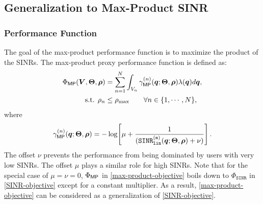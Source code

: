 \subsection{Generalization to Max-Product SINR}\label{MP-Subsection}

\subsubsection{Performance Function}\label{MP-Objective}
The goal of the max-product performance function is to maximize the product of the SINRs. 
The max-product proxy performance function is defined as:
\begin{align}\label{max-product-objective}
    \Phi_{{\sf MP}}(\bm{V}, \mathbf{\Theta}, \bm{\rho}) &=  \sum_{n=1}^{N} \int_{V_n} \gamma^{(n)}_{{\sf MP}} (\bm{q}; \mathbf{\Theta}, \bm{\rho}) \lambda(\bm{q}) d\bm{q}, \\
    \textrm{s.t. } \rho_n &\leq \rho_{\max} \qquad \forall n \in \{1,\cdots, N\}, \label{max-product-objective-constraint}
\end{align}
where
\begin{align}\label{Max-product}
\gamma_{\sf MP}^{(n)}(\bm{q}; \mathbf{\Theta}, \bm{\rho}) = - \log \! \left[ \mu + \frac{1}{(\mathtt{SINR^{(n)}_{lin}}(\bm{q}; \mathbf{\Theta}, \bm{\rho}) + \nu )} \right].
\end{align}
The offset $\nu$ prevents the performance from being dominated by users with very low SINRs. The offset $\mu$ plays a similar role for high SINRs. %
Note that for the special case of $\mu = \nu = 0$, $\Phi_{{\sf MP}}$ in \eqref{max-product-objective} boils down to $\Phi_{\mathtt{SINR}}$ in \eqref{SINR-objective} except for a constant multiplier. As a result, 
\eqref{max-product-objective} can be considered as a generalization of \eqref{SINR-objective}.




